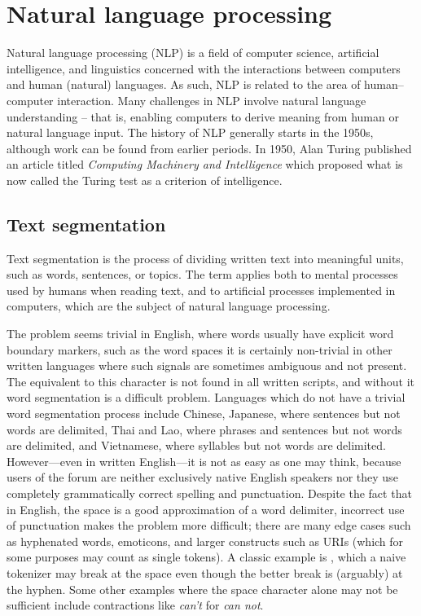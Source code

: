 \section{Natural language processing}

  Natural language processing (NLP) is a field of computer science, artificial intelligence, and linguistics concerned with the interactions between computers and human (natural) languages. As such, NLP is related to the area of human–computer interaction. Many challenges in NLP involve natural language understanding -- that is, enabling computers to derive meaning from human or natural language input. The history of NLP generally starts in the 1950s, although work can be found from earlier periods. In 1950, Alan Turing published an article titled \emph{Computing Machinery and Intelligence} which proposed what is now called the Turing test as a criterion of intelligence\cite{Turing1950}.

  \subsection{Text segmentation}

    Text segmentation is the process of dividing written text into meaningful units, such as words, sentences, or topics. The term applies both to mental processes used by humans when reading text, and to artificial processes implemented in computers, which are the subject of natural language processing. 
      
    The problem seems trivial in English, where words usually have explicit word boundary markers, such as the word spaces it is certainly non-trivial in other written languages where such signals are sometimes ambiguous and not present. The equivalent to this character is not found in all written scripts, and without it word segmentation is a difficult problem. Languages which do not have a trivial word segmentation process include Chinese, Japanese, where sentences but not words are delimited, Thai and Lao, where phrases and sentences but not words are delimited, and Vietnamese, where syllables but not words are delimited. However---even in written English---it is not as easy as one may think, because users of the forum are neither exclusively native English speakers nor they use completely grammatically correct spelling and punctuation. Despite the fact that in English, the space is a good approximation of a word delimiter, incorrect use of punctuation makes the problem more difficult; there are many edge cases such as hyphenated words, emoticons, and larger constructs such as URIs (which for some purposes may count as single tokens). A classic example is , which a naive tokenizer may break at the space even though the better break is (arguably) at the hyphen. Some other examples where the space character alone may not be sufficient include contractions like \emph{can't} for \emph{can not}.
      
